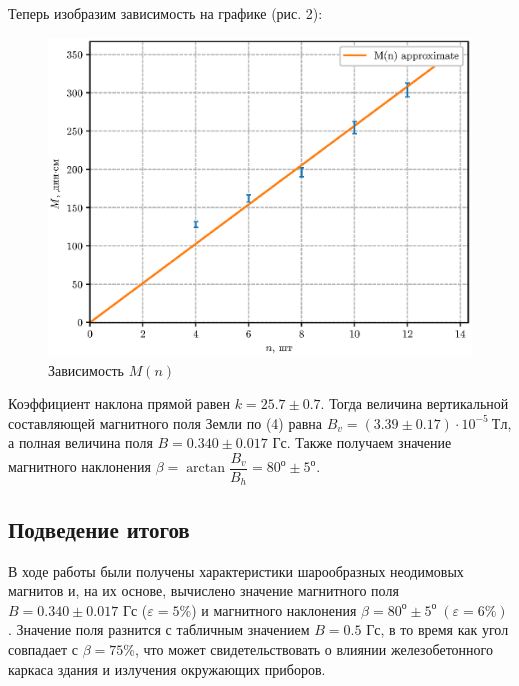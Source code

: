 \documentclass[12pt,a4paper]{article}
\begin{document}
Теперь изобразим зависимость на графике (рис. 2):
\begin{figure}[H]
    \centering
    \includegraphics[width=0.75\linewidth]{pics/mn.eps}
    \caption{Зависимость $M(n)$}
\end{figure}
Коэффициент наклона прямой равен $k = 25.7 \pm 0.7$. 
Тогда величина вертикальной составляющей магнитного поля Земли по (4) равна $B_v = (3.39 \pm 0.17) \cdot 10^{-5}\ Тл$, а полная величина поля $B = 0.340 \pm 0.017$ Гс.
Также получаем значение магнитного наклонения $\beta = \arctan{\dfrac {B_v} {B_h}} = 80^о \pm 5^о$.

\subsection*{Подведение итогов}
В ходе работы были получены характеристики шарообразных неодимовых магнитов и, на их основе, вычислено значение магнитного поля $B = 0.340 \pm 0.017$ Гс ($\varepsilon = 5\%$) и магнитного наклонения $\beta = 80^о \pm 5^о\ (\varepsilon = 6\%)$.
Значение поля разнится с табличным значением $B = 0.5$ Гс, в то время как угол совпадает с $\beta = 75\%$, что может свидетельствовать о влиянии железобетонного каркаса здания и излучения окружающих приборов. 
\end{document}
